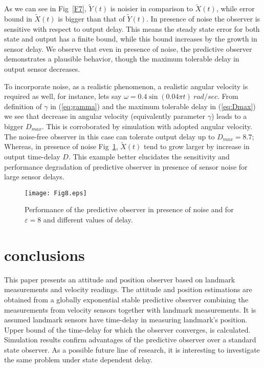 \documentclass[12pt,draftcls,onecolumn]{IEEEtran}
\begin{document}
As we can see in Fig~\ref{F7}, $\tilde Y(t)$ is noisier in comparison to $\tilde X(t)$, while error bound in $\tilde X(t)$ is bigger than that of $\tilde Y(t)$. In presence of noise the observer is sensitive with respect to output delay. This means the steady state error for both state and output has a finite bound, while this bound increases by the growth in sensor delay. We observe that even in presence of noise, the predictive observer demonstrates a plausible behavior, though the maximum tolerable delay in output sensor decreases.

To incorporate noise, as a realistic phenomenon, a realistic angular velocity is required as well, for instance, lets say $\omega=0.4\sin(0.04\pi t)~rad/sec$. From definition of $\gamma$ in (\ref{eq:gamma}) and the maximum tolerable delay in (\ref{eq:Dmax}) we see that decrease in angular velocity (equivalently parameter $\gamma$) leads to a bigger $D_{max}$. This is corroborated by simulation with adopted angular velocity. The noise-free observer in this case can tolerate output delay up to $D_{max}=8.7$; Whereas, in presence of noise Fig~\ref{F8}, $\tilde X(t)$ tend to grow larger by increase in output time-delay $D$. This example better elucidates the sensitivity and performance degradation of predictive observer in presence of sensor noise for large sensor delays.

\begin{figure}[thpb]
\centering
\texttt{[image: Fig8.eps]}
\caption{Performance of the predictive observer in presence of noise and for $\varepsilon = 8$ and different values of delay.}
\label{F8}
\end{figure}

\section{conclusions }

This paper presents an attitude and position observer based on landmark measurements and velocity readings. The attitude and position estimations are obtained from a globally exponential stable predictive observer combining the measurements from velocity sensors together with landmark measurements. It is assumed landmark sensors have time-delay in measuring landmark's position. Upper bound of the time-delay for which the observer converges, is calculated. Simulation results confirm advantages of the predictive observer over a standard state observer. As a possible future line of research, it is interesting to investigate the same problem under state dependent delay.
\end{document}

